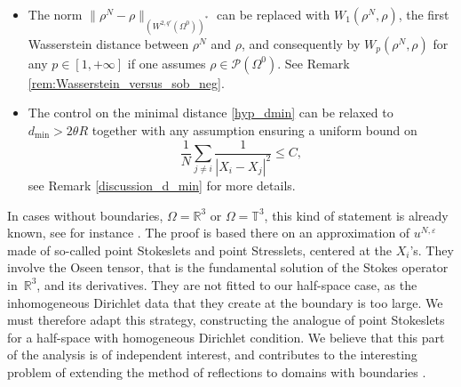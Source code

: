 \documentclass[10pt]{amsart}
\theoremstyle{plain}
\theoremstyle{definition}
\let\eps\varepsilon
\newcommand{\R}{\mathbb{R}}
\newcommand{\T}{\mathbb{T}}
\begin{document}
\begin{itemize}
\item The norm $\|\rho^N-\rho\|_{(W^{2,q'}(\Omega^0))^*}$ can be replaced with $W_1(\rho^N,\rho)$, the first Wasserstein distance between $\rho^N$ and $\rho$, and consequently by $W_p(\rho^N,\rho)$ for any $p\in[1,+\infty]$ if one assumes $\rho \in \mathcal{P}(\Omega^0)$. See Remark \ref{rem:Wasserstein_versus_sob_neg}.
\item The control on the minimal distance \eqref{hyp_dmin} can be relaxed to $d_{\min}>2 \theta R $ together with any assumption ensuring a uniform bound on
\[
\frac{1}{N} \sum_{j \neq i} \frac{1 }{|X_i-X_j|^2} \leq C,
\]
see Remark \ref{discussion_d_min} for more details.
\end{itemize}

In cases without boundaries, $\Omega = \R^3$ or $\Omega = \T^3$, this kind of statement is already known, see for instance \cite{Hofer&Schubert}. The proof is based there on an approximation of $u^{N,\eps}$ made of so-called point Stokeslets and point Stresslets, centered at the $X_i$'s. They involve the Oseen tensor, that is the fundamental solution of the Stokes operator in~$\R^3$, and its derivatives. They are not fitted to our half-space case, as the inhomogeneous Dirichlet data that they create at the boundary is too large. We must therefore adapt this strategy, constructing the analogue of point Stokeslets for a half-space with homogeneous Dirichlet condition. We believe that this part of the analysis is of independent interest, and contributes to the interesting problem of extending the method of reflections to domains with boundaries \cite{Hoefer19}.
\end{document}

